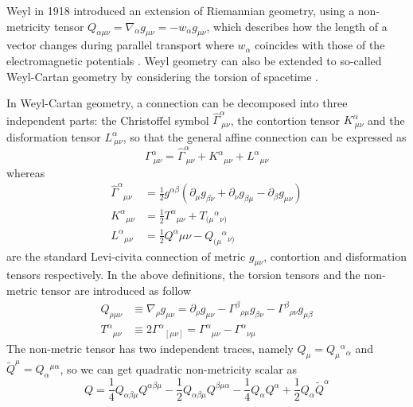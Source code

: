 \documentclass[a4paper,fleqn]{cas-sc}
\begin{document}
Weyl in 1918 introduced an extension of Riemannian geometry, using a non-metricity tensor $Q_{\alpha \mu \nu}=\nabla_\alpha g_{\mu \nu}=-w_\alpha g_{\mu \nu}$, which describes how the length of a vector changes during parallel transport where $w_\alpha$ coincides with those of the electromagnetic potentials \cite{Weyl:1918ib}. Weyl geometry can also be extended to so-called Weyl-Cartan geometry by considering the torsion of spacetime \cite{Xu_2019}.

In Weyl-Cartan geometry, a connection
can be decomposed into three independent parts: the Christoffel symbol $\hat{\Gamma}^\alpha_{\ \mu \nu}$, the contortion tensor $K^\alpha_{\ \mu \nu}$ and the disformation tensor $L^\alpha_{\ \mu \nu}$, so that the general affine connection can be expressed as \cite{J_rv_2018}
\begin{equation}
    \Gamma^\alpha_{\ \mu \nu}=\hat{\Gamma}^\alpha_{\ \mu \nu}+K^{\alpha}{}_{\mu \nu}+L^\alpha{}_{\mu \nu}
\end{equation}
whereas
\begin{align}
    \hat{\Gamma}^\alpha{}_{\mu \nu}& =\frac{1}{2}g^{\alpha \beta}(\partial_\mu g_{\beta \nu}+\partial_\nu g_{\beta \mu}-\partial_\beta g_{\mu \nu}) \\
    K^{\alpha }{}_{\mu \nu }& = \frac{1}{2}T^{\alpha }{}_{\mu \nu }+T_{(\mu}{}^{\alpha }{}_{\nu )} \\
    L^{\alpha}{}_{\mu\nu}& = \frac{1}{2}Q^{\alpha}_{}{\mu\nu}-Q_{(\mu}{}^{\alpha }{}_{\nu)}
\end{align}
are the standard Levi-civita connection of metric $g_{\mu \nu}$, contortion and disformation tensors respectively.
In the above definitions, the torsion tensors and the non-metric tensor are introduced as follow
\begin{align}
Q_{\rho \mu\nu} &\equiv \nabla_{\rho} g_{\mu\nu} = \partial_\rho g_{\mu\nu} - \Gamma^\beta{}_{\rho \mu} g_{\beta\nu} - \Gamma^\beta{}_{\rho\nu} g_{\mu\beta}\\
T^{\alpha}{}_{\mu\nu} &\equiv 2\Gamma^{\alpha}{}_{[\mu\nu]} =\Gamma^{\alpha}{}_{\mu\nu}-\Gamma^{\alpha}{}_{\nu\mu}
\end{align}
The non-metric tensor has two independent traces, namely $Q_{\mu}=Q_{\mu}{}^{\alpha}{}_{\alpha}$ and $\tilde{Q}^{\mu}=Q_{\alpha}{}^{\mu \alpha}$, so we can get quadratic non-metricity scalar as
\begin{equation}
    Q=\dfrac{1}{4}Q_{\alpha\beta\mu}Q^{\alpha\beta\mu}-\dfrac{1}{2}Q_{\alpha\beta\mu}Q^{\beta\mu\alpha}-\dfrac{1}{4}Q_{\alpha}Q^{\alpha}+\dfrac{1}{2}Q_{\alpha}\tilde{Q}^\alpha\label{Qscalar} 
\end{equation} 
\end{document}
